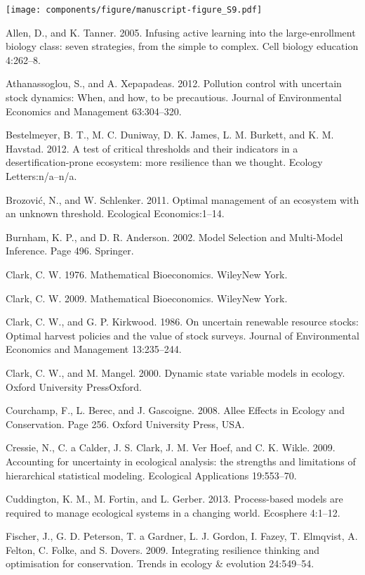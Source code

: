 \documentclass[]{components/elsarticle}
\begin{document}
\texttt{[image: components/figure/manuscript-figure\_S9.pdf]}

Allen, D., and K. Tanner. 2005. Infusing active learning into the
large-enrollment biology class: seven strategies, from the simple to
complex. Cell biology education 4:262--8.

Athanassoglou, S., and A. Xepapadeas. 2012. Pollution control with
uncertain stock dynamics: When, and how, to be precautious. Journal of
Environmental Economics and Management 63:304--320.

Bestelmeyer, B. T., M. C. Duniway, D. K. James, L. M. Burkett, and K. M.
Havstad. 2012. A test of critical thresholds and their indicators in a
desertification-prone ecosystem: more resilience than we thought.
Ecology Letters:n/a--n/a.

Brozović, N., and W. Schlenker. 2011. Optimal management of an ecosystem
with an unknown threshold. Ecological Economics:1--14.

Burnham, K. P., and D. R. Anderson. 2002. Model Selection and
Multi-Model Inference. Page 496. Springer.

Clark, C. W. 1976. Mathematical Bioeconomics. WileyNew York.

Clark, C. W. 2009. Mathematical Bioeconomics. WileyNew York.

Clark, C. W., and G. P. Kirkwood. 1986. On uncertain renewable resource
stocks: Optimal harvest policies and the value of stock surveys. Journal
of Environmental Economics and Management 13:235--244.

Clark, C. W., and M. Mangel. 2000. Dynamic state variable models in
ecology. Oxford University PressOxford.

Courchamp, F., L. Berec, and J. Gascoigne. 2008. Allee Effects in
Ecology and Conservation. Page 256. Oxford University Press, USA.

Cressie, N., C. a Calder, J. S. Clark, J. M. {Ver Hoef}, and C. K.
Wikle. 2009. Accounting for uncertainty in ecological analysis: the
strengths and limitations of hierarchical statistical modeling.
Ecological Applications 19:553--70.

Cuddington, K. M., M. Fortin, and L. Gerber. 2013. Process-based models
are required to manage ecological systems in a changing world. Ecosphere
4:1--12.

Fischer, J., G. D. Peterson, T. a Gardner, L. J. Gordon, I. Fazey, T.
Elmqvist, A. Felton, C. Folke, and S. Dovers. 2009. Integrating
resilience thinking and optimisation for conservation. Trends in ecology
\& evolution 24:549--54.
\end{document}

